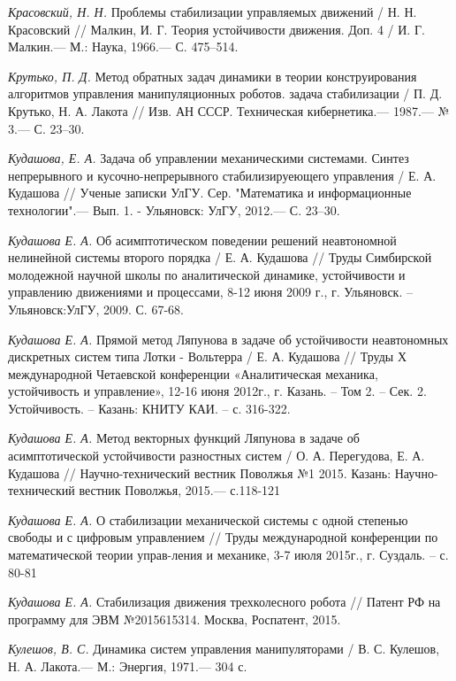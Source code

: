 \begin{thebibliography}{10}
	{\it Красовский, Н. Н.} Проблемы стабилизации управляемых движений / Н. Н. Красовский
	// Малкин, И. Г. Теория устойчивости движения. Доп. 4 / И. Г. Малкин.— М.:
	Наука, 1966.— С. 475–514.
	
	{\it Крутько, П. Д.} Метод обратных задач динамики в теории конструирования алгоритмов
	управления манипуляционных роботов. задача стабилизации / П. Д. Крутько, Н. А. Лакота
	// Изв. АН СССР. Техническая кибернетика.— 1987.— № 3.— С. 23–30.
	
	{\it Кудашова, Е. А.} Задача об управлении механическими системами. Синтез непрерывного и кусочно-непрерывного стабилизируеющего управления / Е. А. Кудашова // Ученые записки УлГУ. Сер. "Математика и информационные технологии".— Вып. 1. - Ульяновск: УлГУ, 2012.— С. 23–30.
	
	{\it Кудашова Е. А.} Об асимптотическом поведении решений неавтономной нелинейной системы второго порядка / Е. А. Кудашова //
	Труды Симбирской молодежной научной школы по аналитической динамике, устойчивости и управлению движениями и процессами, 8-12 июня 2009 г., г. Ульяновск. –Ульяновск:УлГУ, 2009. С. 67-68.
	
	{\it Кудашова Е. А.} Прямой метод Ляпунова в задаче об устойчивости неавтономных дискретных систем типа Лотки - Вольтерра / Е. А. Кудашова //
	Труды Х международной Четаевской конференции «Аналитическая механика, устойчивость и управление», 12-16 июня 2012г., г. Казань. – Том 2. – Сек. 2. Устойчивость. – Казань: КНИТУ КАИ. – с. 316-322.
	
	{\it Кудашова Е. А.} Метод векторных функций Ляпунова в задаче об асимптотической устойчивости разностных систем / О. А. Перегудова, Е. А. Кудашова //
	Научно-технический вестник Поволжья №1 2015. Казань: Научно-технический вестник Поволжья, 2015.— с.118-121


{\it Кудашова Е. А.} О стабилизации механической системы с одной степенью свободы и с цифровым управлением // Труды международной конференции по математической теории управ-ления и механике, 3-7 июля 2015г., г. Суздаль. – с. 80-81

{\it Кудашова Е. А.} Стабилизация движения трехколесного робота //  Патент РФ на программу для ЭВМ №2015615314. Москва, Роспатент, 2015. 

	
	{\it Кулешов, В. С.} Динамика систем управления манипуляторами / В. С. Кулешов,
	Н. А. Лакота.— М.: Энергия, 1971.— 304 с.
	

\end{thebibliography}
